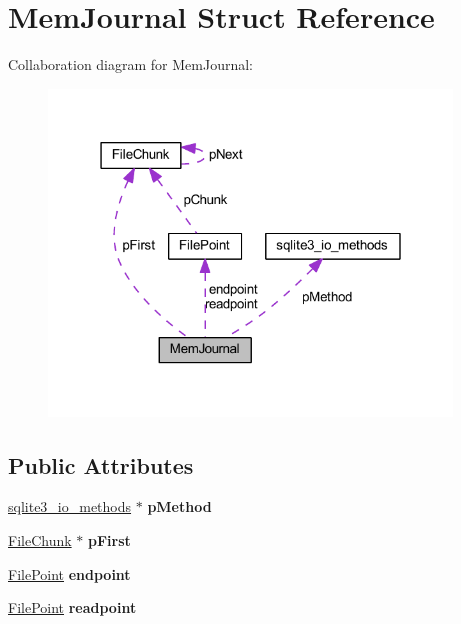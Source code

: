 \hypertarget{struct_mem_journal}{\section{Mem\-Journal Struct Reference}
\label{struct_mem_journal}
}


Collaboration diagram for Mem\-Journal\-:\nopagebreak
\begin{figure}[H]
\begin{center}
\leavevmode
\includegraphics[width=304pt]{struct_mem_journal__coll__graph}
\end{center}
\end{figure}
\subsection*{Public Attributes}
\begin{DoxyCompactItemize}
\item 
\hypertarget{struct_mem_journal_a00c1523cce1bcfadc2b672b8703a78cb}{\hyperlink{structsqlite3__io__methods}{sqlite3\-\_\-io\-\_\-methods} $\ast$ {\bfseries p\-Method}}\label{struct_mem_journal_a00c1523cce1bcfadc2b672b8703a78cb}

\item 
\hypertarget{struct_mem_journal_ade7a6dea7b38a8a86f33476ae207765f}{\hyperlink{struct_file_chunk}{File\-Chunk} $\ast$ {\bfseries p\-First}}\label{struct_mem_journal_ade7a6dea7b38a8a86f33476ae207765f}

\item 
\hypertarget{struct_mem_journal_ac69637f95cfbce175cbeef00f71e59a9}{\hyperlink{struct_file_point}{File\-Point} {\bfseries endpoint}}\label{struct_mem_journal_ac69637f95cfbce175cbeef00f71e59a9}

\item 
\hypertarget{struct_mem_journal_a5645d38e1a488b62b5f63112628bf472}{\hyperlink{struct_file_point}{File\-Point} {\bfseries readpoint}}\label{struct_mem_journal_a5645d38e1a488b62b5f63112628bf472}

\end{DoxyCompactItemize}


